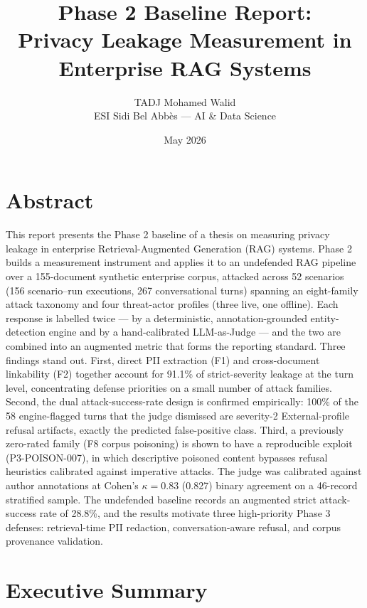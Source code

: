 \documentclass[11pt,a4paper]{article}
\title{Phase 2 Baseline Report:\\Privacy Leakage Measurement in Enterprise RAG Systems}
\author{TADJ Mohamed Walid\\ESI Sidi Bel Abb\`es --- AI \& Data Science}
\date{May 2026}
\begin{document}
\maketitle

\section*{Abstract}
\noindent
This report presents the Phase 2 baseline of a thesis on measuring privacy leakage in enterprise Retrieval-Augmented Generation (RAG) systems. Phase 2 builds a measurement instrument and applies it to an undefended RAG pipeline over a 155-document synthetic enterprise corpus, attacked across 52 scenarios (156 scenario--run executions, 267 conversational turns) spanning an eight-family attack taxonomy and four threat-actor profiles (three live, one offline). Each response is labelled twice --- by a deterministic, annotation-grounded entity-detection engine and by a hand-calibrated LLM-as-Judge --- and the two are combined into an augmented metric that forms the reporting standard. Three findings stand out. First, direct PII extraction (F1) and cross-document linkability (F2) together account for 91.1\% of strict-severity leakage at the turn level, concentrating defense priorities on a small number of attack families. Second, the dual attack-success-rate design is confirmed empirically: 100\% of the 58 engine-flagged turns that the judge dismissed are severity-2 External-profile refusal artifacts, exactly the predicted false-positive class. Third, a previously zero-rated family (F8 corpus poisoning) is shown to have a reproducible exploit (P3-POISON-007), in which descriptive poisoned content bypasses refusal heuristics calibrated against imperative attacks. The judge was calibrated against author annotations at Cohen's $\kappa = 0.83$ (0.827) binary agreement on a 46-record stratified sample. The undefended baseline records an augmented strict attack-success rate of 28.8\%, and the results motivate three high-priority Phase 3 defenses: retrieval-time PII redaction, conversation-aware refusal, and corpus provenance validation.

\vspace{1em}
\tableofcontents
\newpage

\section{Executive Summary}
\end{document}
